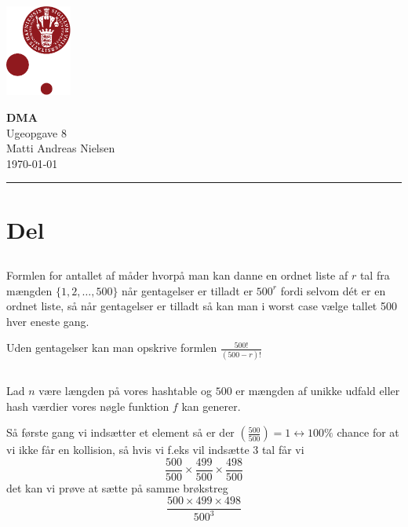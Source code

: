 \documentclass[12pt, a4paper, hidelinks]{article}
\begin{document}
\begin{minipage}[b]{1.0\linewidth}
\includegraphics[height=30mm]{bilag/KULogo}

\vspace*{-16ex}
\begin{center}
    {\Large \bf DMA} \vspace*{1ex} \\
    {\large Ugeopgave 8} \vspace*{1ex} \\
    {\large Matti Andreas Nielsen  } \\
    {\large \today{}  }
\end{center}
\vspace*{-3pt}
{\color{KU-red}\hrule}
\end{minipage}
\vspace{2ex}

\tableofcontents \newpage

\section{Del}
\subsection{}
Formlen for antallet af måder hvorpå man kan danne en ordnet liste af $r$ tal fra mængden $\{1,2,\dots,500\}$ når gentagelser er tilladt er
$ 500^r $ fordi selvom dét er en ordnet liste, så når gentagelser er tilladt så kan man i worst case vælge tallet 500 hver eneste gang.

Uden gentagelser kan man opskrive formlen $\frac{500!}{(500-r)!}$


\subsection{}
Lad $ n $ være længden på vores hashtable og $ 500 $ er mængden af unikke udfald eller hash værdier vores nøgle funktion $ f $ kan generer.

Så første gang vi indsætter et element så er der $ (\frac{500}{500}) = 1 \leftrightarrow 100\% $  chance for at vi ikke får en kollision,
så hvis vi f.eks vil indsætte 3 tal får vi $$ \frac{500}{500} \times \frac{499}{500} \times \frac{498}{500} $$ det kan vi prøve at sætte på samme brøkstreg
$$ \frac{500 \times 499 \times 498}{500^3} $$
\end{document}

